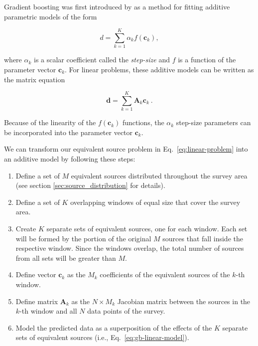 Gradient boosting was first introduced by \citet{friedman2001, friedman2002} as
a method for fitting additive parametric models of the form

\begin{equation}
    d = \sum_{k=1}^K \alpha_k f(\mathbf{c}_k),
\end{equation}

\noindent where $\alpha_k$ is a scalar coefficient called the \emph{step-size}
and $f$ is a function of the parameter vector $\mathbf{c}_k$.
For linear problems, these additive models can be written as the matrix
equation

\begin{equation}
    \mathbf{d} = \sum_{k=1}^K \mathbf{A}_k \mathbf{c}_k \ .
    \label{eq:gb-linear-model}
\end{equation}

\noindent Because of the linearity of the $f(\mathbf{c}_k)$ functions, the
$\alpha_k$ step-size parameters can be incorporated into the parameter vector
$\mathbf{c}_k$.

We can transform our equivalent source problem in
Eq.~\ref{eq:linear-problem} into an additive model by following these
steps:

\begin{enumerate}
  \item Define a set of $M$ equivalent sources distributed throughout the
    survey area (see section \ref{sec:source_distribution} for details).
  \item Define a set of $K$ overlapping windows of equal size that cover the
    survey area.
  \item Create $K$ separate sets of equivalent sources, one for each window.
    Each set will be formed by the portion of the original $M$ sources that
    fall inside the respective window.
    Since the windows overlap, the total number of sources from all sets will
    be greater than $M$.
  \item Define vector $\mathbf{c}_k$ as the $M_k$ coefficients of the
    equivalent sources of the $k$-th window.
  \item Define matrix $\mathbf{A}_k$ as the $N \times M_k$ Jacobian matrix
    between the sources in the $k$-th window and all $N$ data points of the
    survey.
  \item Model the predicted data as a superposition of the effects of the $K$
    separate sets of equivalent sources (i.e., Eq.~\ref{eq:gb-linear-model}).
\end{enumerate}

